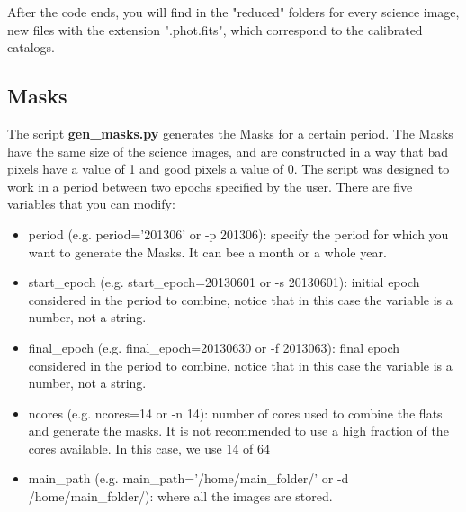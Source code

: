 \documentclass[letter, 12pt]{article}
\begin{document}
After the code ends, you will find in the "reduced" folders for every science image, new files with the extension ".phot.fits", which correspond to the calibrated catalogs. 


\subsection{Masks}

The script \textbf{gen\_masks.py} generates the Masks for a certain period. The Masks have the same size of the science images, and are constructed in a way that bad pixels have a value of 1 and good pixels a value of 0.
The script was designed to work in a period between two epochs specified by the user. There are five variables that you can modify:

\begin{itemize}

\item period (e.g. period='201306' or -p 201306): specify the period for which you want to generate the Masks. It can bee a month or a whole year.

\item start\_epoch (e.g. start\_epoch=20130601  or -s 20130601): initial epoch considered in the period to combine, notice that in this case the variable is a number, not a string.

\item final\_epoch (e.g. final\_epoch=20130630 or -f 2013063): final epoch considered in the period to combine, notice that in this case the variable is a number, not a string.



\item ncores (e.g. ncores=14 or -n 14): number of cores used to combine the flats and generate the masks. It is not recommended to use a high fraction of the cores available. In this case, we use 14 of 64

\item main\_path (e.g. main\_path='/home/main\_folder/' or -d /home/main\_folder/): where all the images are stored.


\end{itemize}
\end{document}

